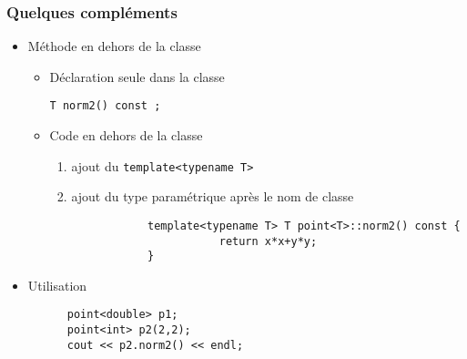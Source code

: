 \begin{frame}[fragile]\frametitle{Quelques compléments}
\begin{itemize}
	\item Méthode en dehors de la classe
	\begin{itemize}
		\item Déclaration seule dans la classe
\begin{lstlisting}
T norm2() const ;
\end{lstlisting}
		\item Code en dehors de la classe
		\begin{enumerate}
			\item ajout du \texttt{template<typename T>}
			\item ajout du type paramétrique après le nom de classe
		\end{enumerate}
		\begin{lstlisting}
		       template<typename T> T point<T>::norm2() const {
		                  return x*x+y*y;
		       }
		\end{lstlisting}
	\end{itemize}
	\item Utilisation
	\begin{lstlisting}
	  point<double> p1;
	  point<int> p2(2,2);
      cout << p2.norm2() << endl;
	\end{lstlisting}
\end{itemize}
\end{frame}
